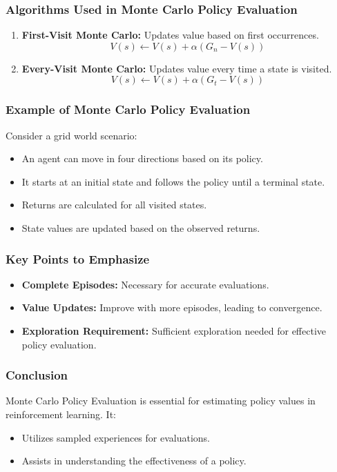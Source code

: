 \documentclass[aspectratio=169]{beamer}
\begin{document}
\begin{frame}[fragile]
    \frametitle{Algorithms Used in Monte Carlo Policy Evaluation}
    \begin{enumerate}
        \item \textbf{First-Visit Monte Carlo:} Updates value based on first occurrences.
            \begin{equation}
                V(s) \gets V(s) + \alpha (G_n - V(s))
            \end{equation}
        \item \textbf{Every-Visit Monte Carlo:} Updates value every time a state is visited.
            \begin{equation}
                V(s) \gets V(s) + \alpha (G_t - V(s))
            \end{equation}
    \end{enumerate}
\end{frame}

\begin{frame}[fragile]
    \frametitle{Example of Monte Carlo Policy Evaluation}
    Consider a grid world scenario:
    \begin{itemize}
        \item An agent can move in four directions based on its policy.
        \item It starts at an initial state and follows the policy until a terminal state.
        \item Returns are calculated for all visited states.
        \item State values are updated based on the observed returns.
    \end{itemize}
\end{frame}

\begin{frame}[fragile]
    \frametitle{Key Points to Emphasize}
    \begin{itemize}
        \item \textbf{Complete Episodes:} Necessary for accurate evaluations.
        \item \textbf{Value Updates:} Improve with more episodes, leading to convergence.
        \item \textbf{Exploration Requirement:} Sufficient exploration needed for effective policy evaluation.
    \end{itemize}
\end{frame}

\begin{frame}[fragile]
    \frametitle{Conclusion}
    Monte Carlo Policy Evaluation is essential for estimating policy values in reinforcement learning. It:
    \begin{itemize}
        \item Utilizes sampled experiences for evaluations.
        \item Assists in understanding the effectiveness of a policy.
    \end{itemize}
\end{frame}
\end{document}
